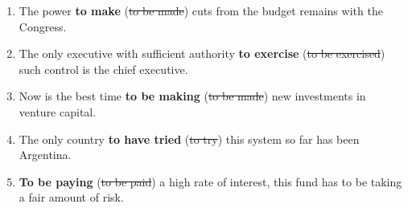 \documentclass[main.tex]{subfiles}
\begin{document}
\begin{enumerate}[nosep]
	\item The power \textbf{to make} (\st{to be made}) cuts from the budget remains with the Congress.
	\item The only executive with sufficient authority \textbf{to exercise} (\st{to be exercised}) such control is the chief executive.
	\item Now is the best time \textbf{to be making} (\st{to be made}) new investments in venture capital.
	\item The only country \textbf{to have tried} (\st{to try}) this system so far has been Argentina.
	\item \textbf{To be paying} (\st{to be paid}) a high rate of interest, this fund has to be taking a fair amount of risk.
\end{enumerate}
\end{document}
